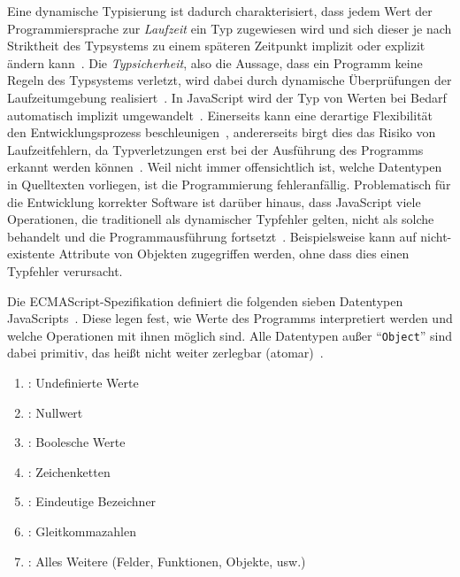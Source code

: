 Eine dynamische Typisierung ist dadurch charakterisiert, dass jedem Wert der Programmiersprache zur \emph{Laufzeit} ein Typ zugewiesen wird und sich dieser je nach Striktheit des Typsystems zu einem späteren Zeitpunkt implizit oder explizit ändern kann~\autocite[45]{WALDMANN:PPS}. Die \emph{Typsicherheit}, also die Aussage, dass ein Programm keine Regeln des Typsystems verletzt, wird dabei durch dynamische Überprüfungen der Laufzeitumgebung realisiert~\autocite[37]{CARDELLI:TYPE_SYSTEMS}. In JavaScript wird der Typ von Werten bei Bedarf automatisch implizit umgewandelt~\autocite{RICHARDS:2010}. Einerseits kann eine derartige Flexibilität den Entwicklungsprozess beschleunigen~\autocite[1]{FLOW:PAPER}, andererseits birgt dies das Risiko von Laufzeitfehlern, da Typverletzungen erst bei der Ausführung des Programms erkannt werden können~\autocite{ANDERSON:2005}. Weil nicht immer offensichtlich ist, welche Datentypen in Quelltexten vorliegen, ist die Programmierung fehleranfällig. Problematisch für die Entwicklung korrekter Software ist darüber hinaus, dass JavaScript viele Operationen, die traditionell als dynamischer Typfehler gelten, nicht als solche behandelt und die Programmausführung fortsetzt~\autocite{NIKHIL:2014}. Beispielsweise kann auf nicht-existente Attribute von Objekten zugegriffen werden, ohne dass dies einen Typfehler verursacht.

Die ECMAScript-Spezifikation definiert die folgenden sieben Datentypen JavaScripts~\autocite[25]{ECMASCRIPT:2019}. Diese legen fest, wie Werte des Programms interpretiert werden und welche Operationen mit ihnen möglich sind. Alle Datentypen außer \enquote{\texttt{Object}} sind dabei primitiv, das heißt nicht weiter zerlegbar (atomar)~\autocite[8]{ECMASCRIPT:2019}.
\begin{enumerate}[midpenalty=1000]
  \item {}: Undefinierte Werte
  \item {}: Nullwert
  \item {}: Boolesche Werte
  \item {}: Zeichenketten
  \item {}: Eindeutige Bezeichner
  \item {}: Gleitkommazahlen
  \item {}: Alles Weitere (Felder, Funktionen, Objekte, usw.)
\end{enumerate}


